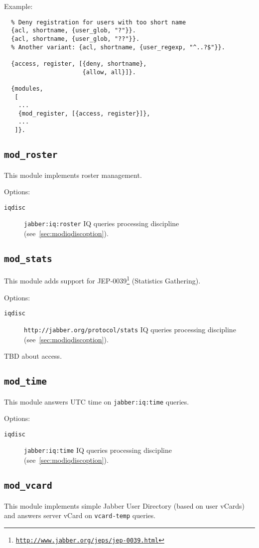 \documentclass[a4paper,10pt]{article}
\newcommand{\bracehack}{\def\{{\char"7B}\def\}{\char"7D}}
\newcommand{\ns}[1]{\texttt{#1}}
\newcommand{\module}[1]{\texttt{#1}}
\newcommand{\modroster}{\module{mod\_roster}}
\newcommand{\modstats}{\module{mod\_stats}}
\newcommand{\modtime}{\module{mod\_time}}
\newcommand{\modvcard}{\module{mod\_vcard}}
\newcommand{\titem}[1]{\item[\bracehack\texttt{#1}]}
\gdef\footahref#1#2{#2\footnote{\href{#1}{\texttt{#1}}}}
\newcommand{\tjepref}[2]{\footahref{http://www.jabber.org/jeps/jep-#1.html}{#2}}
\newcommand{\jepref}[1]{\tjepref{#1}{JEP-#1}}
\newcommand{\iqdiscitem}[1]{\titem{iqdisc} #1 IQ queries processing
discipline (see~\ref{sec:modiqdiscoption}).}
\begin{document}
Example:
\begin{verbatim}
  % Deny registration for users with too short name
  {acl, shortname, {user_glob, "?"}}.
  {acl, shortname, {user_glob, "??"}}.
  % Another variant: {acl, shortname, {user_regexp, "^..?$"}}.

  {access, register, [{deny, shortname},
                      {allow, all}]}.

  {modules,
   [
    ...
    {mod_register, [{access, register}]},
    ...
   ]}.
\end{verbatim}


\subsection{\modroster{}}
\label{sec:modroster}

This module implements roster management.

Options:
\begin{description}
\iqdiscitem{\ns{jabber:iq:roster}}
\end{description}


\subsection{\modstats{}}
\label{sec:modstats}

This module adds support for \jepref{0039} (Statistics Gathering).

Options:
\begin{description}
\iqdiscitem{\ns{http://jabber.org/protocol/stats}}
\end{description}

TBD about access.


\subsection{\modtime{}}
\label{sec:modtime}

This module answers UTC time on \ns{jabber:iq:time} queries.

Options:
\begin{description}
\iqdiscitem{\ns{jabber:iq:time}}
\end{description}


\subsection{\modvcard{}}
\label{sec:modvcard}

This module implements simple Jabber User Directory (based on user vCards)
and answers server vCard on \ns{vcard-temp} queries.
\end{document}
